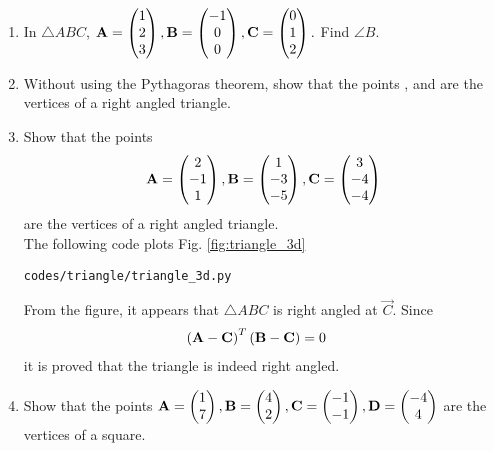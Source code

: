 \documentclass[journal,12pt,twocolumn]{IEEEtran}
\renewcommand\thesection{\arabic{section}}
\begin{document}
\begin{enumerate}[label=\thesection.\arabic*.,ref=\thesection.\theenumi]
\item In $\triangle ABC$, 
$
\mathbf{A} = \begin{pmatrix}1\\2 \\3\end{pmatrix},
\mathbf{B} = \begin{pmatrix}-1\\0 \\0\end{pmatrix},
\mathbf{C} = \begin{pmatrix}0\\ 1\\2\end{pmatrix}.
$
Find $\angle B$.
\\
\solution
%
\item Without using the Pythagoras theorem, show that the points ,  and  are the vertices of a right angled triangle.
\\
\solution
%
\item Show that the points 
\begin{align}
\mathbf{A} = \begin{pmatrix}2\\-1 \\1\end{pmatrix},
\mathbf{B} = \begin{pmatrix}1\\-3 \\-5\end{pmatrix},
\mathbf{C} = \begin{pmatrix}3\\ -4\\-4\end{pmatrix}
\end{align}
%
are the vertices of a right angled triangle.
\\
\solution 
The following code plots Fig. \ref{fig:triangle_3d}
%
\begin{lstlisting}
codes/triangle/triangle_3d.py
\end{lstlisting}
%
%
From the figure, it appears that $\triangle ABC$ is right angled at $\vec{C}$.  Since 
\begin{align}
\left(\mathbf{A}-\mathbf{C}\right)^T\left(\mathbf{B}-\mathbf{C}\right)&=0
\end{align}
%
it is proved that the triangle is indeed right angled.
\item Show that the points $\mathbf{A} = \begin{pmatrix}1\\7\end{pmatrix}, \mathbf{B} = \begin{pmatrix}4\\2\end{pmatrix}, \mathbf{C}=\begin{pmatrix}-1\\-1\end{pmatrix},\mathbf{D}= \begin{pmatrix}-4\\4\end{pmatrix} $  are the vertices of a square.

\end{enumerate}
\end{document}
